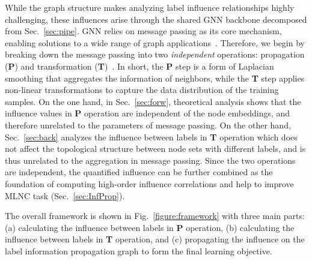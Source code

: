 While the graph structure makes analyzing label influence relationships highly challenging, these influences arise through the shared GNN backbone decomposed from Sec.~\ref{sec:pipe}. 
GNN relies on message passing as its core mechanism, enabling solutions to a wide range of graph applications~\citep{wu2020comprehensive}. 
Therefore, we begin by breaking down the message passing into two \emph{independent} operations: propagation (\textbf{P}) and transformation (\textbf{T})~\citep{zhang2022model}. 
In short, the \textbf{P} step is a form of Laplacian smoothing that aggregates the information of neighbors, while the \textbf{T} step applies non-linear transformations to capture the data distribution of the training samples. 
On the one hand, in Sec.~\ref{sec:forw}, theoretical analysis shows that the influence values in \textbf{P} operation are independent of the node embeddings, and therefore unrelated to the parameters of message passing. 
On the other hand, Sec.~\ref{sec:back} analyzes the influence between labels in \textbf{T} operation which does not affect the topological structure between node sets with different labels, and is thus unrelated to the aggregation in message passing.
Since the two operations are independent, the quantified influence can be further combined as the foundation of computing high-order influence correlations and help to improve MLNC task (Sec.~\ref{sec:InfProp}). 

The overall framework is shown in Fig.~\ref{figure:framework} with three main parts: (a) calculating the influence between labels in \textbf{P} operation, (b) calculating the influence between labels in \textbf{T} operation, and (c) 
propagating the influence on the label information propagation graph to form the final learning objective.


